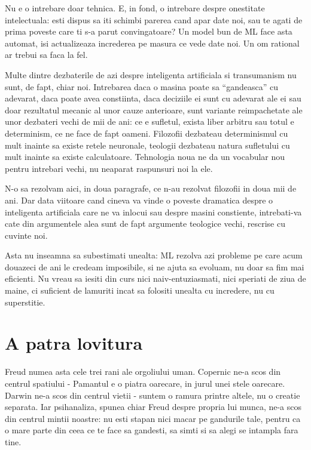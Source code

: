 Nu e o intrebare doar tehnica. E, in fond, o intrebare despre onestitate
intelectuala: esti dispus sa iti schimbi parerea cand apar date noi, sau
te agati de prima poveste care ti s-a parut convingatoare? Un model bun
de ML face asta automat, isi actualizeaza increderea pe masura ce vede
date noi. Un om rational ar trebui sa faca la fel.

Multe dintre dezbaterile de azi despre inteligenta artificiala si
transumanism nu sunt, de fapt, chiar noi. Intrebarea daca o masina poate
sa ``gandeasca'' cu adevarat, daca poate avea constiinta, daca deciziile
ei sunt cu adevarat ale ei sau doar rezultatul mecanic al unor cauze
anterioare, sunt variante reimpachetate ale unor dezbateri vechi de mii
de ani: ce e sufletul, exista liber arbitru sau totul e determinism, ce
ne face de fapt oameni. Filozofii dezbateau determinismul cu mult inainte
sa existe retele neuronale, teologii dezbateau natura sufletului cu mult
inainte sa existe calculatoare. Tehnologia noua ne da un vocabular nou
pentru intrebari vechi, nu neaparat raspunsuri noi la ele.

N-o sa rezolvam aici, in doua paragrafe, ce n-au rezolvat filozofii in
doua mii de ani. Dar data viitoare cand cineva va vinde o poveste
dramatica despre o inteligenta artificiala care ne va inlocui sau despre
masini constiente, intrebati-va cate din argumentele alea sunt de fapt
argumente teologice vechi, rescrise cu cuvinte noi.

Asta nu inseamna sa subestimati unealta: ML rezolva azi probleme pe care
acum douazeci de ani le credeam imposibile, si ne ajuta sa evoluam, nu
doar sa fim mai eficienti. Nu vreau sa iesiti din curs nici
naiv-entuziasmati, nici speriati de ziua de maine, ci suficient de
lamuriti incat sa folositi unealta cu incredere, nu cu superstitie.

\section*{A patra lovitura}

Freud numea asta cele trei rani ale orgoliului uman. Copernic ne-a scos
din centrul spatiului - Pamantul e o piatra oarecare, in jurul unei
stele oarecare. Darwin ne-a scos din centrul vietii - suntem o ramura
printre altele, nu o creatie separata. Iar psihanaliza, spunea chiar
Freud despre propria lui munca, ne-a scos din centrul mintii noastre: nu
esti stapan nici macar pe gandurile tale, pentru ca o mare parte din
ceea ce te face sa gandesti, sa simti si sa alegi se intampla fara tine.

